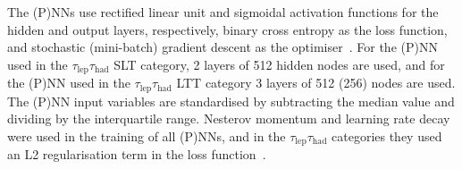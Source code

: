 
The (P)NNs use rectified linear unit and sigmoidal activation functions 
for the hidden and output layers, respectively, binary cross entropy as the loss function, 
and stochastic (mini-batch) gradient descent as the optimiser~\cite{Goodfellow-et-al-2016}. 
For the (P)NN used in the $\tau_\text{lep}\tau_\text{had}$ SLT category, 
2 layers of 512 hidden nodes are used, 
and for the (P)NN used in the $\tau_\text{lep}\tau_\text{had}$ LTT category 
3 layers of 512 (256) nodes are used. 
The (P)NN input variables are standardised by subtracting 
the median value and dividing by the interquartile range. 
Nesterov momentum and learning rate decay were used in the training of all (P)NNs, 
and in the $\tau_\text{lep}\tau_\text{had}$ categories they used an L2 regularisation term 
in the loss function~\cite{Goodfellow-et-al-2016}. 

